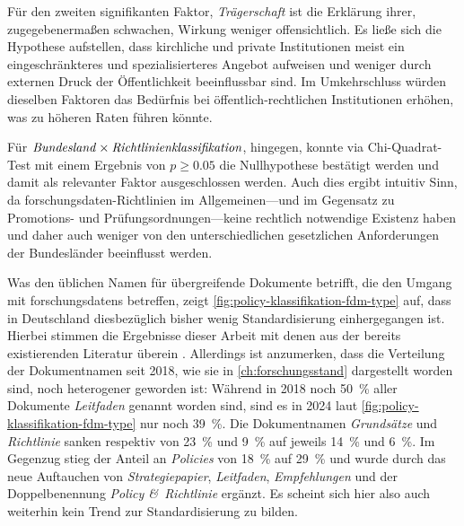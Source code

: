 Für den zweiten signifikanten Faktor, \textit{Trägerschaft} ist die Erklärung ihrer, zugegebenermaßen schwachen, Wirkung weniger offensichtlich.
Es ließe sich die Hypothese aufstellen, dass kirchliche und private Institutionen meist ein eingeschränkteres und spezialisierteres Angebot aufweisen und weniger durch externen Druck der Öffentlichkeit beeinflussbar sind.
Im Umkehrschluss würden dieselben Faktoren das Bedürfnis bei öffentlich-rechtlichen Institutionen erhöhen, was zu höheren Raten führen könnte.

Für $\text{\textit{Bundesland}}\times\text{\textit{Richtlinienklassifikation}}$, hingegen, konnte via Chi-Quadrat-Test mit einem Ergebnis von $p\geqslant\num{0,05}$ die Nullhypothese bestätigt werden und damit als relevanter Faktor ausgeschlossen werden.
Auch dies ergibt intuitiv Sinn, da \gls{forschungsdaten}-Richtlinien im Allgemeinen---und im Gegensatz zu Promotions- und Prüfungsordnungen---keine rechtlich notwendige Existenz haben und daher auch weniger von den unterschiedlichen gesetzlichen Anforderungen der Bundesländer beeinflusst werden.

Was den üblichen Namen für übergreifende Dokumente betrifft, die den Umgang mit \glspl{forschungsdaten} betreffen, zeigt \cref{fig:policy-klassifikation-fdm-type} auf, dass in Deutschland diesbezüglich bisher wenig Standardisierung einhergegangen ist.
Hierbei stimmen die Ergebnisse dieser Arbeit mit denen aus der bereits existierenden Literatur überein \autocite{Hiemenz2018-fdm-title,Hiemenz2018-fdm-report}.
Allerdings ist anzumerken, dass die Verteilung der Dokumentnamen seit 2018, wie sie in \cref{ch:forschungsstand} dargestellt worden sind, noch heterogener geworden ist:
Während in 2018 noch \SI{50}{\percent} aller Dokumente \textit{Leitfaden} genannt worden sind, sind es in 2024 laut \cref{fig:policy-klassifikation-fdm-type} nur noch \SI{39}{\percent}.
Die Dokumentnamen \textit{Grundsätze} und \textit{Richtlinie} sanken respektiv von \SI{23}{\percent} und \SI{9}{\percent} auf jeweils \SI{14}{\percent} und \SI{6}{\percent}.
Im Gegenzug stieg der Anteil an \textit{Policies} von \SI{18}{\percent} auf \SI{29}{\percent} und wurde durch das neue Auftauchen von \textit{Strategiepapier}, \textit{Leitfaden}, \textit{Empfehlungen} und der Doppelbenennung \textit{Policy \&\ Richtlinie} ergänzt.
Es scheint sich hier also auch weiterhin kein Trend zur Standardisierung zu bilden.

